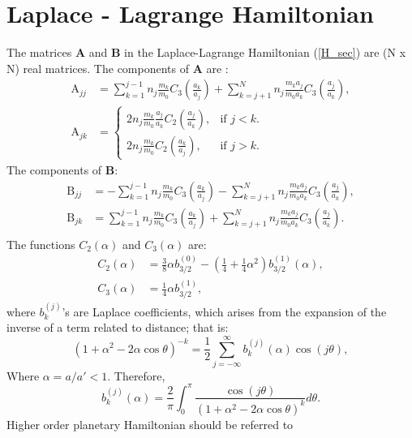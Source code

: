 \documentclass[12pt]{article}
\begin{document}
	\section{Laplace - Lagrange Hamiltonian} \label{App:H_LL}
	The matrices $ \mathbf{A} $ and $ \mathbf{B} $ in the Laplace-Lagrange Hamiltonian (\ref{H_sec}) are (N x N) real matrices. The components of $\mathbf{A}$ are \citep{laskar1995}:
	\begin{equation}
	\begin{aligned}
	\text{A}_{jj} &= \sum_{k=1}^{j-1} n_j \frac{m_k}{m_0} C_3 \left( \frac{a_k}{a_j} \right) + \sum_{k=j+1}^{N} n_j \frac{m_k a_j}{m_0 a_k} C_3 \left( \frac{a_j}{a_k} \right), \\ 
	\text{A}_{jk} &=\begin{cases}
	2n_j \frac{m_k}{m_0} \frac{a_j}{a_k} C_2  \left(  \frac{a_j}{a_k} \right) , & \text{if } j < k.\\ 
	2n_j \frac{m_k}{m_0} C_2 \left(  \frac{a_k}{a_j} \right)  , & \text{if } j>k.
	\end{cases}
	\end{aligned}
	\end{equation}
	The components of $\mathbf{B}$:
	\begin{equation}
	\begin{aligned}
	\text{B}_{jj} &= - \sum_{k=1}^{j-1} n_j \frac{m_k}{m_0} C_3 \left( \frac{a_k}{a_j} \right) - \sum_{k=j+1}^{N} n_j \frac{m_k a_j}{m_0 a_k} C_3 \left( \frac{a_j}{a_k} \right), \\ 
	\text{B}_{jk} &=  \sum_{k=1}^{j-1} n_j \frac{m_k}{m_0} C_3 \left( \frac{a_k}{a_j} \right) + \sum_{k=j+1}^{N} n_j \frac{m_k a_j}{m_0 a_k} C_3 \left( \frac{a_j}{a_k} \right). \\ 
	\end{aligned}
	\end{equation}
	The functions $C_2(\alpha)$ and $C_3(\alpha)$ are:
	\begin{equation}
	\begin{aligned}
	C_2 (\alpha) &= \frac{3}{8} \alpha b_{3/2}^{(0)} - \left( \frac{1}{4} + \frac{1}{4} \alpha^2 \right) b^{(1)}_{3/2}(\alpha), \\
	C_3 (\alpha) &= \frac{1}{4} \alpha b_{3/2}^{(1)},
	\end{aligned}
	\end{equation}
	where $b_k^{(j)}$'s are Laplace coefficients, which arises from the expansion of the inverse of a term related to distance; that is:
	\begin{equation}
	(1 + \alpha^2 - 2\alpha \cos \theta )^{-k} = \frac{1}{2} \sum_{j= - \infty}^{\infty}b_k^{(j)}(\alpha) \cos (j \theta),
	\end{equation}    
	Where $\alpha = a/a' <1$. Therefore,
	\begin{equation}
	b^{(j)}_k (\alpha) = \frac{2}{\pi} \int_{0}^{\pi} \frac{\cos(j\theta)}{(1 + \alpha^2 - 2\alpha \cos \theta )^k} d\theta.
	\end{equation}
	Higher order planetary Hamiltonian should be referred to \citep{laskar1995}
	
	\newpage
	
	
	
\end{document}
